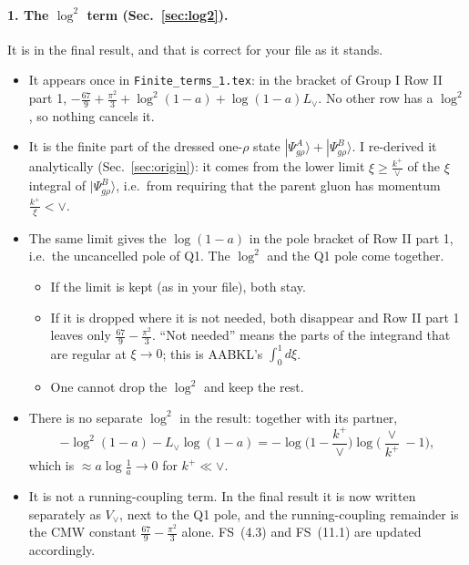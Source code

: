 \documentclass[10pt]{article}
\numberwithin{equation}{section}
\newcommand{\Lv}{L_{\vee}}
\begin{document}
\paragraph{1. The $\log^2$ term (Sec.~\ref{sec:log2}).} It is in the final result, and that is correct for your file as it stands.
\begin{itemize}
\item It appears once in \texttt{Finite\_terms\_1.tex}: in the bracket of Group I Row II part 1, $-\frac{67}{9}+\frac{\pi^2}{3}+\log^2(1-a)+\log(1-a)\Lv$. No other row has a $\log^2$, so nothing cancels it.
\item It is the finite part of the dressed one-$\rho$ state $|\Psi^A_{g\rho}\rangle+|\Psi^B_{g\rho}\rangle$. I re-derived it analytically (Sec.~\ref{sec:origin}): it comes from the lower limit $\xi\ge\frac{k^+}{\vee}$ of the $\xi$ integral of $|\Psi^B_{g\rho}\rangle$, i.e.\ from requiring that the parent gluon has momentum $\frac{k^+}{\xi}<\vee$.
\item The same limit gives the $\log(1-a)$ in the pole bracket of Row II part 1, i.e.\ the uncancelled pole of Q1. The $\log^2$ and the Q1 pole come together.
\begin{itemize}
\item If the limit is kept (as in your file), both stay.
\item If it is dropped where it is not needed, both disappear and Row II part 1 leaves only $\frac{67}{9}-\frac{\pi^2}{3}$. ``Not needed'' means the parts of the integrand that are regular at $\xi\to0$; this is AABKL's $\int_0^1d\xi$.
\item One cannot drop the $\log^2$ and keep the rest.
\end{itemize}
\item There is no separate $\log^2$ in the result: together with its partner,
\begin{equation*}
-\log^2(1-a)-\Lv\log(1-a)=-\log\Big(1-\frac{k^+}{\vee}\Big)\log\Big(\frac{\vee}{k^+}-1\Big),
\end{equation*}
which is $\approx a\log\frac1a\to0$ for $k^+\ll\vee$.
\item It is not a running-coupling term. In the final result it is now written separately as $V_\vee$, next to the Q1 pole, and the running-coupling remainder is the CMW constant $\frac{67}{9}-\frac{\pi^2}{3}$ alone. FS~(4.3) and FS~(11.1) are updated accordingly.
\end{itemize}
\end{document}
